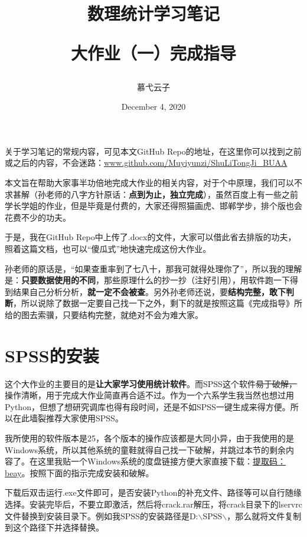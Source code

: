 \documentclass[10pt, a4paper]{article}
\title{数理统计学习笔记 \par 大作业（一）完成指导}
\author{慕弋云子}
\date{December 4, 2020}
\begin{document}
\maketitle

关于学习笔记的常规内容，可见本文GitHub Repo的地址，在这里你可以找到之前或之后的内容，不会迷路：\url{www.github.com/Muyiyunzi/ShuLiTongJi_BUAA} \par
本文旨在帮助大家事半功倍地完成大作业的相关内容，对于个中原理，我们可以不求甚解（孙老师的八字方针原话：\textbf{点到为止，独立完成}），虽然百度上有一些之前学长学姐的作业，但是毕竟是付费的，大家还得照猫画虎、邯郸学步，排个版也会花费不少的功夫。\par

于是，我在GitHub Repo中上传了.docx的文件，大家可以借此省去排版的功夫，照着这篇文档，也可以“傻瓜式”地快速完成这份大作业。\par
孙老师的原话是，“如果查重率到了七八十，那我可就得处理你了”，所以我的理解是：\textbf{只要数据使用的不同}，那些原理什么的抄一抄（注好引用），用软件跑一下得到结果自己分析分析，\textbf{就一定不会被查}。另外孙老师还说，要\textbf{结构完整，敢下判断}，所以说除了数据一定要自己找一下之外，剩下的就是按照这篇《完成指导》所给的图去索骥，只要结构完整，就绝对不会为难大家。\par

\section{SPSS的安装}
这个大作业的主要目的是\textbf{让大家学习使用统计软件}。而SPSS这个软件\sout{易于破解，}操作清晰，用于完成大作业简直再合适不过。作为一个六系学生我当然也想过用Python，但想了想研究调库也得有段时间，还是不如SPSS一键生成来得方便。所以在此墙裂推荐大家使用SPSS。\par
我所使用的软件版本是25，各个版本的操作应该都是大同小异，由于我使用的是Windows系统，所以其他系统的童鞋就得自己找一下破解，并跳过本节的剩余内容了。在这里我贴一个Windows系统的度盘链接方便大家直接下载：\href{https://pan.baidu.com/s/1WDLkJQhU631BkLGUSQe1_g}{提取码：beay}。按照下面的指示完成安装和破解。\par
下载后双击运行.exe文件即可，是否安装Python的补充文件、路径等可以自行随缘选择。安装完毕后，不要立即激活，然后将crack.rar解压，将crack目录下的lservrc文件替换到安装目录下。例如我SPSS的安装路径是D:$\backslash$SPSS$\backslash$，那么就将文件复制到这个路径下并选择替换。\par
\end{document}
